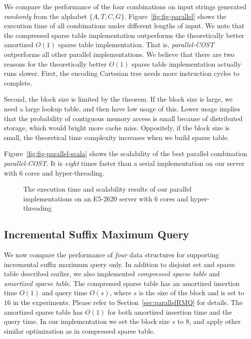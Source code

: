 We compare the performance of the four combinations on input strings
generated {\em randomly} from the alphabet $\{A, T, C, G\}$.
Figure~\ref{fig:fig-parallel} shows the execution time of all
combinations under different lengths of input.  We note that the
compressed sparse table implementation outperforms the theoretically
better amortized $O(1)$ sparse table implementation.  That is, {\em
parallel-COST} outperforms all other parallel implementations.  We
believe that there are two reasons for the theoretically better $O(1)$
sparse table implementation actually runs slower.  First, the encoding
Cartesian tree needs more instruction cycles to complete.


Second, the block size is limited by the theorem.  If the block size is
large, we need a large lookup table, and then have low usage of this.
Lower usage implies that the probability of contiguous memory access is
small because of distributed storage, which would bright more cache
miss. Oppositely, if the block size is small, the theoretical time
complexity increases when we build sparse table.

Figure~\ref{fig:fig-parallel-scala} shows the scalability of the best
parallel combination {\em parallel-COST}.  It is {\em eight} times
faster than a serial implementation on our server with 6 cores and
hyper-threading.

\begin{figure}
  \centering
  \caption{The execution time and scalability results of our parallel
    implementations on an E5-2620 server with 6 cores and
    hyper-threading}
\end{figure}


\subsection{Incremental Suffix Maximum Query}

We now compare the performance of {\em four} data structures for
supporting incremental suffix maximum query only.  In addition to
disjoint set and sparse table described earlier, we also implemented
{\em compressed sparse table} and {\em amortized sparse table}.  The
compressed sparse table has an amortized insertion time $O(1)$ and
query time $O(s)$, where $s$ is the size of the block and is set to
$16$ in the experiments.  Please refer to
Section~\ref{sec:parallelRMQ} for details.  The amortized sparse table
has $O(1)$ for both amortized insertion time and the query time.  In
our implementation we set the block size $s$ to $8$, and apply other
similar optimization as in compressed sparse table.

